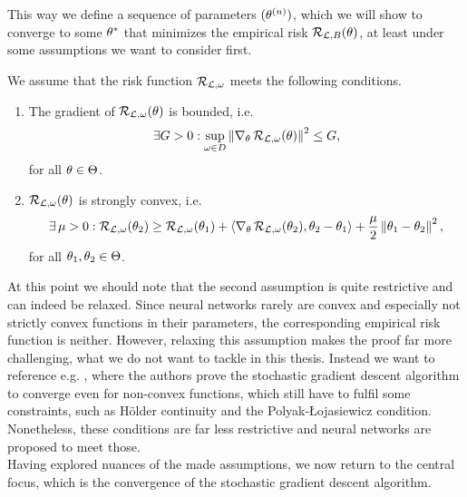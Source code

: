 This way we define a sequence of parameters $(\theta^{(n)})$, which we will show to converge to some $\theta^{\ast}$ that minimizes the empirical risk $\operatorname{\mathcal{R}}_{\operatorname{\mathcal{L}},B}(\theta)$, at least under some assumptions we want to consider first.
\begin{assumption}\label{ass:sgd}
We assume that the risk function $\operatorname{\mathcal{R}}_{\operatorname{\mathcal{L}},\omega}$ meets the following conditions.
\begin{enumerate}
\item The gradient of $\operatorname{\mathcal{R}}_{\operatorname{\mathcal{L}},\omega}(\theta)$ is bounded, i.e.
\begin{align}\label{eq:ass1}
\exists G > 0: \sup_{\omega\in D} \left\| \nabla_{\theta} \operatorname{\mathcal{R}}_{\operatorname{\mathcal{L}},\omega}(\theta) \right\|^2 \leq G,
\end{align}
for all $\theta\in\operatorname{\Theta}$.
\item $\operatorname{\mathcal{R}}_{\operatorname{\mathcal{L}},\omega}(\theta)$ is strongly convex, i.e.
\begin{align}\label{eq:ass2}
\exists \operatorname{\mu}>0: \operatorname{\mathcal{R}}_{\operatorname{\mathcal{L}},\omega}(\theta_2) \geq \operatorname{\mathcal{R}}_{\operatorname{\mathcal{L}},\omega}(\theta_1) + \left\langle \nabla_{\theta} \operatorname{\mathcal{R}}_{\operatorname{\mathcal{L}},\omega}(\theta_2), \theta_2-\theta_1 \right\rangle + \frac{\operatorname{\mu}}{2} \left\| \theta_1 - \theta_2 \right\|^2,
\end{align}
for all $\theta_1,\theta_2 \in\operatorname{\Theta}$.
\end{enumerate}
\end{assumption}
At this point we should note that the second assumption is quite restrictive and can indeed be relaxed. Since neural networks rarely are convex and especially not strictly convex functions in their parameters, the corresponding empirical risk function is neither. However, relaxing this assumption makes the proof far more challenging, what we do not want to tackle in this thesis. Instead we want to reference e.g. \cite{lei2019stochastic}, where the authors prove the stochastic gradient descent algorithm to converge even for non-convex functions, which still have to fulfil some constraints, such as Hölder continuity and the Polyak-\L{}ojasiewicz condition. Nonetheless, these conditions are far less restrictive and neural networks are proposed to meet those.\\
Having explored nuances of the made assumptions, we now return to the central focus, which is the convergence of the stochastic gradient descent algorithm.

